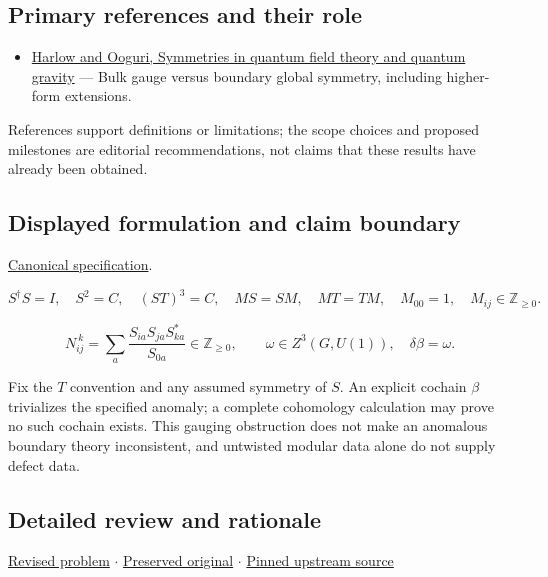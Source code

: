 \documentclass[
  11pt,
]{article}
\providecommand{\tightlist}{%
  \setlength{\itemsep}{0pt}\setlength{\parskip}{0pt}}
\begin{document}
\subsection{Primary references and their role}

\begin{itemize}
\tightlist
\item
  \href{https://arxiv.org/abs/1810.05338}{Harlow and Ooguri, Symmetries
  in quantum field theory and quantum gravity} --- Bulk gauge versus
  boundary global symmetry, including higher-form extensions.
\end{itemize}

References support definitions or limitations; the scope choices and
proposed milestones are editorial recommendations, not claims that these
results have already been obtained.

\subsection{Displayed formulation and claim boundary}

\href{https://github.com/rick-stevens-ai/Pure-Thought/blob/main/PRDs/08-Swampland-Modularity-Symmetries.md}{Canonical
specification}.

\[S^\dagger S=I,\quad S^2=C,\quad(ST)^3=C,\quad
MS=SM,\quad MT=TM,\quad M_{00}=1,\quad M_{ij}\in\mathbb Z_{\ge0}.\]

\[N_{ij}^{\ k}=\sum_a\frac{S_{ia}S_{ja}S_{ka}^*}{S_{0a}}
\in\mathbb Z_{\ge0},\qquad \omega\in Z^3(G,U(1)),\quad\delta\beta=\omega.\]

Fix the \(T\) convention and any assumed symmetry of \(S\). An explicit
cochain \(\beta\) trivializes the specified anomaly; a complete
cohomology calculation may prove no such cochain exists. This gauging
obstruction does not make an anomalous boundary theory inconsistent, and
untwisted modular data alone do not supply defect data.

\subsection{Detailed review and rationale}

\href{https://github.com/rick-stevens-ai/Pure-Thought/blob/main/PRDs/08-Swampland-Modularity-Symmetries.md}{Revised
problem} \ensuremath{\cdot}
\href{https://github.com/rick-stevens-ai/Pure-Thought/blob/main/archive/original-PRDs/08-Swampland-Modularity-Symmetries.md}{Preserved
original} \ensuremath{\cdot}
\href{https://github.com/rick-stevens-ai/Pure-Thought/blob/f854d4e12b55c1f5b5c2a964b75f2d23496d981e/PRDs/08-Swampland-Modularity-Symmetries.md}{Pinned
upstream source}
\end{document}
